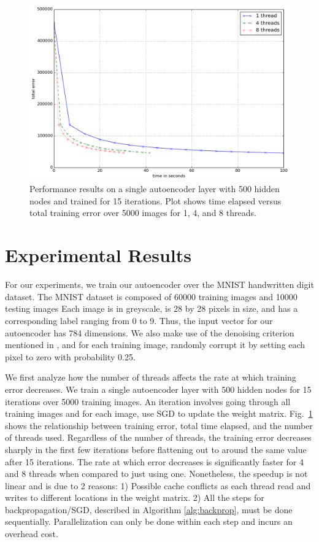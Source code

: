 \documentclass[conference]{IEEEtran}
\begin{document}
\begin{figure}[h]
\centering
\includegraphics[width=0.9\linewidth]{experiment1.png}
\caption{Performance results on a single autoencoder layer with 500 hidden nodes and trained for 15 iterations. Plot shows time elapsed versus total training error over 5000 images for 1, 4, and 8 threads.}
\label{fig:experiment1}
\end{figure}

\section{Experimental Results}
For our experiments, we train our autoencoder over the MNIST handwritten digit dataset. The MNIST dataset is composed of 60000 training images and 10000 testing images Each image is in greyscale, is 28 by 28 pixels in size, and has a corresponding label ranging from 0 to 9. Thus, the input vector for our autoencoder has 784 dimensions. We also make use of the denoising criterion mentioned in \cite{vincent2010stacked}, and for each training image, randomly corrupt it by setting each pixel to zero with probability 0.25. 

We first analyze how the number of threads affects the rate at which training error decreases. We train a single autoencoder layer with 500 hidden nodes for 15 iterations over 5000 training images. An iteration involves going through all training images and for each image, use SGD to update the weight matrix. Fig.~\ref{fig:experiment1} shows the relationship between training error, total time elapsed, and the number of threads used. Regardless of the number of threads, the training error decreases sharply in the first few iterations before flattening out to around the same value after 15 iterations. The rate at which error decreases is significantly faster for 4 and 8 threads when compared to just using one. Nonetheless, the speedup is not linear and is due to 2 reasons: 1) Possible cache conflicts as each thread read and writes to different locations in the weight matrix. 2) All the steps for backpropagation/SGD, described in Algorithm \ref{alg:backprop}, must be done sequentially. Parallelization can only be done within each step and incurs an overhead cost.
\end{document}
